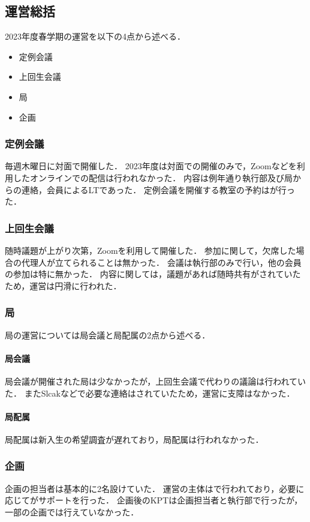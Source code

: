 \subsection*{運営総括}


2023年度春学期の運営を以下の4点から述べる．
\begin{itemize}
    \item 定例会議
    \item 上回生会議
    \item 局
    \item 企画
\end{itemize}

\subsubsection*{定例会議}
毎週木曜日に対面で開催した．
2023年度は対面での開催のみで，Zoomなどを利用したオンラインでの配信は行われなかった．
内容は例年通り執行部及び局からの連絡，会員によるLTであった．
定例会議を開催する教室の予約は\kensuiChief{}が行った．

\subsubsection*{上回生会議}
随時議題が上がり次第，Zoomを利用して開催した．
参加に関して，欠席した場合の代理人が立てられることは無かった．
会議は執行部のみで行い，他の会員の参加は特に無かった．
内容に関しては，議題があれば随時共有がされていたため，運営は円滑に行われた．

\subsubsection*{局}
局の運営については局会議と局配属の2点から述べる．
\paragraph*{局会議}
局会議が開催された局は少なかったが，上回生会議で代わりの議論は行われていた．
またSlcakなどで必要な連絡はされていたため，運営に支障はなかった．
\paragraph*{局配属}
局配属は新入生の希望調査が遅れており，局配属は行われなかった．

\subsubsection*{企画}
企画の担当者は基本的に2名設けていた．
運営の主体は\secondGrade{}で行われており，必要に応じて\thirdGrade{}がサポートを行った．
企画後のKPTは企画担当者と執行部で行ったが，一部の企画では行えていなかった．
